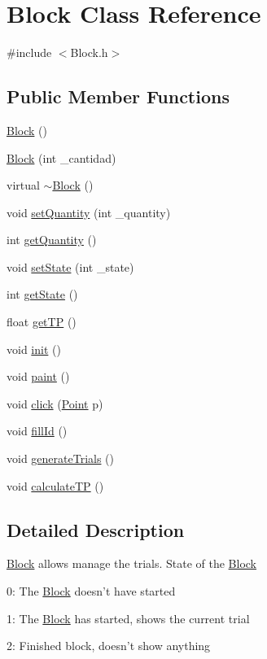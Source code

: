 \hypertarget{class_block}{
\section{Block Class Reference}
\label{class_block}
}


{\ttfamily \#include $<$Block.h$>$}

\subsection*{Public Member Functions}
\begin{DoxyCompactItemize}
\item 
\hyperlink{class_block_a37658a946bf5067ad01d68d9ff086adc}{Block} ()
\item 
\hyperlink{class_block_adf23566c89dd2cd0bb6137b27fc2e8a7}{Block} (int \_\-cantidad)
\item 
virtual \hyperlink{class_block_a19d1bd0e1cef6a865ed2745a2e648405}{$\sim$Block} ()
\item 
void \hyperlink{class_block_ab665724e220de58b40704719a8da183b}{setQuantity} (int \_\-quantity)
\item 
int \hyperlink{class_block_aaa0a5cd1ca22a7c85a683bb736042cc1}{getQuantity} ()
\item 
void \hyperlink{class_block_a980fbc1957521327e41ea8a1eb6e8e95}{setState} (int \_\-state)
\item 
int \hyperlink{class_block_aeaa7b785eb3448f9305bca564ebddbe7}{getState} ()
\item 
float \hyperlink{class_block_a878b298886ed335bc355021794b17c16}{getTP} ()
\item 
void \hyperlink{class_block_a5a9b68685f25f3d27937bffb5799b15c}{init} ()
\item 
void \hyperlink{class_block_a708e7b263d7641aa3f38a338d4d4f93a}{paint} ()
\item 
void \hyperlink{class_block_aa9b90d55b9acb5b08dfd0e60f4355763}{click} (\hyperlink{class_point}{Point} p)
\item 
void \hyperlink{class_block_a1bb14a4844e1dc65a54c5a1bf6780ef8}{fillId} ()
\item 
void \hyperlink{class_block_a8077b4c73c94e4ec0e83151d81c9c54c}{generateTrials} ()
\item 
void \hyperlink{class_block_acf280d07c11b0e4f9526e8fa255b457b}{calculateTP} ()
\end{DoxyCompactItemize}


\subsection{Detailed Description}
\hyperlink{class_block}{Block} allows manage the trials. State of the \hyperlink{class_block}{Block}
\begin{DoxyItemize}
\item 0: The \hyperlink{class_block}{Block} doesn't have started
\item 1: The \hyperlink{class_block}{Block} has started, shows the current trial
\item 2: Finished block, doesn't show anything 
\end{DoxyItemize}


